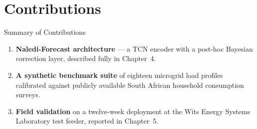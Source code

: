 \section{Contributions}
\begin{contribbox}{Summary of Contributions}
\begin{enumerate}
  \item \textbf{Naledi-Forecast architecture} --- a TCN encoder with a post-hoc Bayesian
        correction layer, described fully in Chapter~4.
  \item \textbf{A synthetic benchmark suite} of eighteen microgrid load profiles calibrated
        against publicly available South African household consumption surveys.
  \item \textbf{Field validation} on a twelve-week deployment at the Wits Energy Systems
        Laboratory test feeder, reported in Chapter~5.
\end{enumerate}
\end{contribbox}
